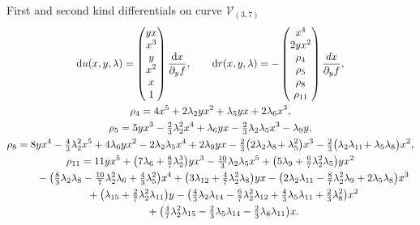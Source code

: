 \documentclass[pdftex]{sigma}
\numberwithin{equation}{section}
\newcommand{\rmd}{\mathrm{d}}
\begin{document}
First and second kind differentials on curve $\mathcal{V}_{(3,7)}$
\begin{gather}
 \rmd u(x,y,\lambda) =\begin{pmatrix}
 yx \\ x^3 \\ y \\ x^2 \\x \\ 1
 \end{pmatrix} \frac{\rmd x}{\partial_y f}, \qquad
 \rmd r(x,y,\lambda) = - \begin{pmatrix}
 x^4 \\ 2 y x^2 \\ \rho_4 \\ \rho_5 \\ \rho_8 \\ \rho_{11}
 \end{pmatrix}\frac{dx}{\partial_y f}, \label{Diffs37} \\
\notag \rho_4 = 4x^5 + 2\lambda_2 y x^2 + \lambda_5 yx + 2\lambda_6 x^3, \\
 \rho_5 = 5 y x^3 - \tfrac{2}{3} \lambda_2^2 x^4 + \lambda_6 yx - \tfrac{2}{3} \lambda_2 \lambda_5 x^3 - \lambda_9 y, \nonumber\\
 \rho_8 = 8 y x^4 - \tfrac{4}{3} \lambda_2^2 x^5 + 4\lambda_6 y x^2 - 2\lambda_2 \lambda_5 x^4 + 2\lambda_9 y x - \tfrac{2}{3} \big(2\lambda_2 \lambda_8\! + \lambda_5^2\big) x^3
 - \tfrac{2}{3}\big(\lambda_2\lambda_{11} \!+ \lambda_5 \lambda_8 \big) x^2, \nonumber\\
 \rho_{11} = 11 y x^5 + \big(7\lambda_6 + \tfrac{8}{7}\lambda_2^3\big) yx^3 - \tfrac{10}{3} \lambda_2 \lambda_5 x^5 + \big(5\lambda_9
 + \tfrac{6}{7} \lambda_2^2 \lambda_5\big) y x^2 \nonumber\\
\hphantom{\rho_{11} =}{} - \big(\tfrac{8}{3} \lambda_2 \lambda_8 - \tfrac{10}{7} \lambda_2^2 \lambda_6 + \tfrac{4}{3} \lambda_5^2\big) x^4
 + \big(3\lambda_{12} + \tfrac{4}{7} \lambda_2^2 \lambda_8\big) y x
 - \big(2\lambda_2 \lambda_{11} - \tfrac{8}{7} \lambda_2^2 \lambda_9 + 2\lambda_5 \lambda_8 \big) x^3\nonumber\\
 \hphantom{\rho_{11} =}{} + \big(\lambda_{15} + \tfrac{2}{7} \lambda_2^2 \lambda_{11}\big) y - \big(\tfrac{4}{3}\lambda_2 \lambda_{14} - \tfrac{6}{7} \lambda_2^2 \lambda_{12}
 + \tfrac{4}{3} \lambda_5 \lambda_{11} + \tfrac{2}{3} \lambda_8^2 \big) x^2 \nonumber \\
\hphantom{\rho_{11} =}{} + \big(\tfrac{4}{7} \lambda_2^2 \lambda_{15} - \tfrac{2}{3} \lambda_5 \lambda_{14} - \tfrac{2}{3} \lambda_8 \lambda_{11}\big) x.\nonumber
\end{gather}
\end{document}
